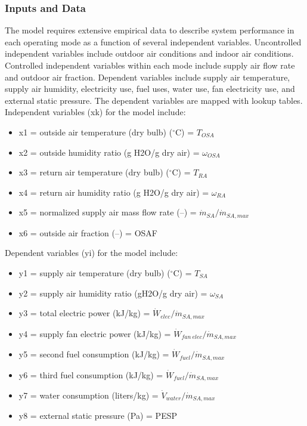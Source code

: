 \subsubsection{Inputs and Data}
The model requires extensive empirical data to describe system performance in each operating mode as a function of several independent variables. Uncontrolled independent variables include outdoor air conditions and indoor air conditions. Controlled independent variables within each mode include supply air flow rate and outdoor air fraction. Dependent variables include supply air temperature, supply air humidity, electricity use, fuel uses, water use, fan electricity use, and external static pressure.  The dependent variables are mapped with lookup tables.
Independent variables (xk) for the model include:
\begin{itemize}
 \item x1 = outside air temperature (dry bulb) ($^{\circ}$C) = \({T_{OSA}}\)
 \item x2 = outside humidity ratio (g H2O/g dry air) = \({\omega_{OSA}}\)
 \item x3 = return air temperature (dry bulb) ($^{\circ}$C) = \(T_{RA}\)
 \item x4 = return air humidity ratio  (g H2O/g dry air) = \({\omega_{RA}}\)
 \item x5 = normalized supply air mass flow rate (–) = \(\dot m_{SA}/{\dot m_{SA,max}}\)
 \item x6 = outside air fraction (–) = OSAF
\end{itemize}

Dependent variables (yi) for the model include:
\begin{itemize}
 \item y1 = supply air temperature (dry bulb) ($^{\circ}$C) = \({T_{SA}}\)
 \item y2 = supply air humidity ratio (gH2O/g dry air) = \({\omega_{SA}}\)
 \item y3 = total electric power (kJ/kg) = \({\dot W_{elec}}/{\dot m_{SA,max}}\)
 \item y4 = supply fan electric power (kJ/kg) = \({\dot W_{fan~elec}}/{\dot m_{SA,max}}\)
 \item y5 = second fuel consumption (kJ/kg) = \({\dot W_{fuel}}/{\dot m_{SA,max}}\)
 \item y6 = third fuel consumption (kJ/kg) = \({\dot W_{fuel}}/{\dot m_{SA,max}}\)
 \item y7 = water consumption (liters/kg) = \({\dot V_{water}}/{\dot m_{SA,max}}\)
 \item y8 = external static pressure (Pa) = PESP
\end{itemize}

